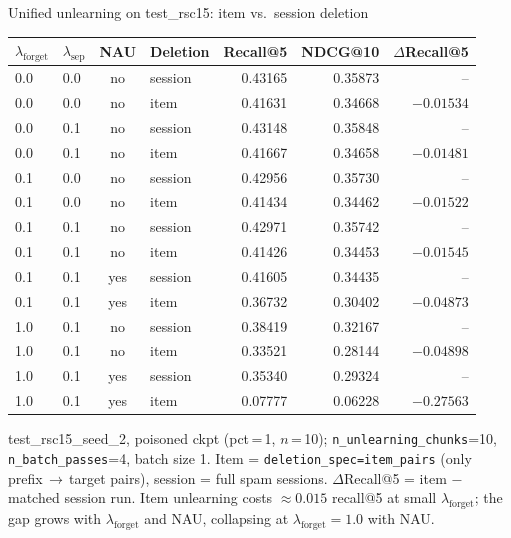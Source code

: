 \begin{frame}{Unified unlearning on test\_rsc15: item vs.\ session deletion}
  \begin{table}
    \centering
    \footnotesize
    \begin{tabular}{l l c l r r r}
      \hline
      $\lambda_{\text{forget}}$ & $\lambda_{\text{sep}}$ & NAU & Deletion & Recall@5 & NDCG@10 & $\Delta$Recall@5 \\
      \hline
      0.0 & 0.0 & no  & session & 0.43165 & 0.35873 & --         \\
      0.0 & 0.0 & no  & item    & 0.41631 & 0.34668 & $-0.01534$ \\[2pt]
      0.0 & 0.1 & no  & session & 0.43148 & 0.35848 & --         \\
      0.0 & 0.1 & no  & item    & 0.41667 & 0.34658 & $-0.01481$ \\[2pt]
      0.1 & 0.0 & no  & session & 0.42956 & 0.35730 & --         \\
      0.1 & 0.0 & no  & item    & 0.41434 & 0.34462 & $-0.01522$ \\[2pt]
      0.1 & 0.1 & no  & session & 0.42971 & 0.35742 & --         \\
      0.1 & 0.1 & no  & item    & 0.41426 & 0.34453 & $-0.01545$ \\[2pt]
      0.1 & 0.1 & yes & session & 0.41605 & 0.34435 & --         \\
      0.1 & 0.1 & yes & item    & 0.36732 & 0.30402 & $-0.04873$ \\[2pt]
      1.0 & 0.1 & no  & session & 0.38419 & 0.32167 & --         \\
      1.0 & 0.1 & no  & item    & 0.33521 & 0.28144 & $-0.04898$ \\[2pt]
      1.0 & 0.1 & yes & session & 0.35340 & 0.29324 & --         \\
      1.0 & 0.1 & yes & item    & 0.07777 & 0.06228 & $-0.27563$ \\
      \hline
    \end{tabular}
  \end{table}

  \medskip
  {\scriptsize
    test\_rsc15\_seed\_2, poisoned ckpt (pct\,=\,1, $n$\,=\,10);
    \texttt{n\_unlearning\_chunks}=10, \texttt{n\_batch\_passes}=4, batch size 1.
    Item = \texttt{deletion\_spec=item\_pairs} (only prefix\,$\to$\,target pairs),
    session = full spam sessions.
    $\Delta$Recall@5 = item $-$ matched session run.
    Item unlearning costs $\approx 0.015$ recall@5 at small $\lambda_{\text{forget}}$;
    the gap grows with $\lambda_{\text{forget}}$ and NAU, collapsing at
    $\lambda_{\text{forget}}=1.0$ with NAU.}
\end{frame}
